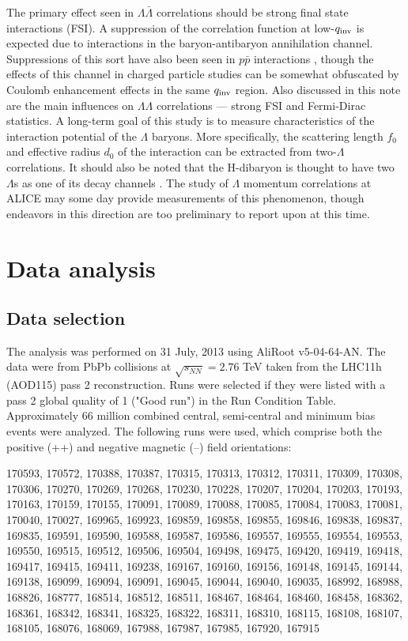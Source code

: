 The primary effect seen in $\Lambda\bar{\Lambda}$ correlations should be strong final state interactions (FSI).  A suppression of the correlation function at low-$q_{\rm inv}$ is expected due to interactions in the baryon-antibaryon annihilation channel.  Suppressions of this sort have also been seen in $p \bar{p}$ interactions \cite{Gos:2007cj}, though the effects of this channel in charged particle studies can be somewhat obfuscated by Coulomb enhancement effects in the same $q_{\rm inv}$ region.  Also discussed in this note are the main influences on $\Lambda\Lambda$ correlations --- strong FSI and Fermi-Dirac statistics.  A long-term goal of this study is to measure characteristics of the interaction potential of the $\Lambda$ baryons.  More specifically, the scattering length $f_0$ and effective radius $d_0$ of the interaction can be extracted from two-$\Lambda$ correlations. It should also be noted that the H-dibaryon is thought to have two $\Lambda$s as one of its decay channels \cite{PhysRevLett.38.195}.  The study of $\Lambda$ momentum correlations at ALICE may some day provide measurements of this phenomenon, though endeavors in this direction are too preliminary to report upon at this time.

\section{Data analysis}
\subsection{Data selection}
\label{sec:DataSelection}
The analysis was performed on 31 July, 2013 using AliRoot v5-04-64-AN. The data were from PbPb collisions at $\sqrt{s_{NN}}=2.76$  TeV taken from the LHC11h (AOD115) pass 2 reconstruction. Runs were selected if they were listed with a pass 2 global quality of 1 ("Good run") in the Run Condition Table. Approximately 66 million combined central, semi-central and minimum bias events were analyzed. The following runs were used, which comprise both the positive (++) and negative magnetic (--) field orientations:

170593, 170572, 170388, 170387, 170315, 170313, 170312, 170311, 170309, 170308, 170306, 170270, 170269, 170268, 170230, 170228, 170207, 170204, 170203, 170193, 170163, 170159, 170155, 170091, 170089, 170088, 170085, 170084, 170083, 170081, 170040, 170027, 169965, 169923, 169859, 169858, 169855, 169846, 169838, 169837, 169835, 169591, 169590, 169588, 169587, 169586, 169557, 169555, 169554, 169553, 169550, 169515, 169512, 169506, 169504, 169498, 169475, 169420, 169419, 169418, 169417, 169415, 169411, 169238, 169167, 169160, 169156, 169148, 169145, 169144, 169138, 169099, 169094, 169091, 169045, 169044, 169040, 169035, 168992, 168988, 168826, 168777, 168514, 168512, 168511, 168467, 168464, 168460, 168458, 168362, 168361, 168342, 168341, 168325, 168322, 168311, 168310, 168115, 168108, 168107, 168105, 168076, 168069, 167988, 167987, 167985, 167920, 167915


